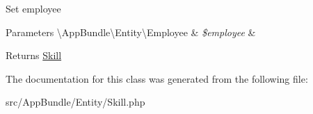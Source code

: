 Set employee


\begin{DoxyParams}[1]{Parameters}
\textbackslash{}\+App\+Bundle\textbackslash{}\+Entity\textbackslash{}\+Employee & {\em \$employee} & \\
\hline
\end{DoxyParams}
\begin{DoxyReturn}{Returns}
\mbox{\hyperlink{class_app_bundle_1_1_entity_1_1_skill}{Skill}} 
\end{DoxyReturn}


The documentation for this class was generated from the following file\+:\begin{DoxyCompactItemize}
\item 
src/\+App\+Bundle/\+Entity/Skill.\+php\end{DoxyCompactItemize}
